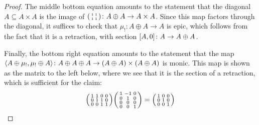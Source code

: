 \documentclass[11pt, oneside, article]{memoir}
\theoremstyle{plain}
\theoremstyle{definition}
\theoremstyle{remark}
\DeclarePairedDelimiter{\pair}{\langle}{\rangle}
\DeclarePairedDelimiter{\copair}{[}{]}
\renewcommand{\ss}{\subseteq}
\newcommand{\lsh}[1]{#1_!}
\begin{document}
\begin{proof}
The middle bottom equation amounts to the statement that the diagonal $A\ss A\times A$ is the image of $\tiny\begin{psmallmatrix}1&1\\1&1\end{psmallmatrix}\colon A\oplus A\to A\times A$. Since this map factors through the diagonal, it suffices to check that $\lsh{\mu}\colon A\oplus A\to A$ is epic, which follows from the fact that it is a retraction, with section $\copair{A,0}\colon A\to A\oplus A$.

Finally, the bottom right equation amounts to the statement that the map $\pair{A\oplus\lsh{\mu},\lsh{\mu}\oplus A}\colon A\oplus A\oplus A\to (A\oplus A)\times(A\oplus A)$ is monic. This map is shown as the matrix to the left below, where we see that it is the section of a retraction, which is sufficient for the claim:
\[
\begin{psmallmatrix}
  1&1&0&0\\
  0&1&1&0\\
  0&0&1&1
\end{psmallmatrix}
\begin{psmallmatrix}
  1&-1&0\\
  0&1&0\\
  0&0&0\\
  0&0&1
\end{psmallmatrix}
=
\begin{psmallmatrix}
  1&0&0\\
  0&1&0\\
  0&0&1
\end{psmallmatrix}
\]


\end{proof}
\end{document}
